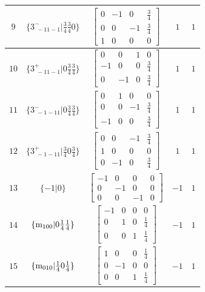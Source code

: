 \documentclass[fleqn,8pt]{jsarticle}
\begin{document}
\begin{longtable}{ccccc}
$ 9 $ & $ \{3^{-}_{\,\,-11-1}|\frac{3}{4} \frac{3}{4} 0\} $ & $ \begin{bmatrix} 0 & -1 & 0 & \frac{3}{4} \\ 0 & 0 & -1 & \frac{3}{4} \\ 1 & 0 & 0 & 0 \end{bmatrix} $ & $ 1 $ & $ 1 $ \\ \hline
$ 10 $ & $ \{3^{+}_{\,\,-11-1}|0 \frac{3}{4} \frac{3}{4}\} $ & $ \begin{bmatrix} 0 & 0 & 1 & 0 \\ -1 & 0 & 0 & \frac{3}{4} \\ 0 & -1 & 0 & \frac{3}{4} \end{bmatrix} $ & $ 1 $ & $ 1 $ \\ \hline
$ 11 $ & $ \{3^{-}_{\,\,-1-11}|0 \frac{3}{4} \frac{3}{4}\} $ & $ \begin{bmatrix} 0 & 1 & 0 & 0 \\ 0 & 0 & -1 & \frac{3}{4} \\ -1 & 0 & 0 & \frac{3}{4} \end{bmatrix} $ & $ 1 $ & $ 1 $ \\ \hline
$ 12 $ & $ \{3^{+}_{\,\,-1-11}|\frac{3}{4} 0 \frac{3}{4}\} $ & $ \begin{bmatrix} 0 & 0 & -1 & \frac{3}{4} \\ 1 & 0 & 0 & 0 \\ 0 & -1 & 0 & \frac{3}{4} \end{bmatrix} $ & $ 1 $ & $ 1 $ \\ \hline
$ 13 $ & $ \{-1|0\} $ & $ \begin{bmatrix} -1 & 0 & 0 & 0 \\ 0 & -1 & 0 & 0 \\ 0 & 0 & -1 & 0 \end{bmatrix} $ & $ -1 $ & $ 1 $ \\ \hline
$ 14 $ & $ \{{\rm m}_{100}|0 \frac{1}{4} \frac{1}{4}\} $ & $ \begin{bmatrix} -1 & 0 & 0 & 0 \\ 0 & 1 & 0 & \frac{1}{4} \\ 0 & 0 & 1 & \frac{1}{4} \end{bmatrix} $ & $ -1 $ & $ 1 $ \\ \hline
$ 15 $ & $ \{{\rm m}_{010}|\frac{1}{4} 0 \frac{1}{4}\} $ & $ \begin{bmatrix} 1 & 0 & 0 & \frac{1}{4} \\ 0 & -1 & 0 & 0 \\ 0 & 0 & 1 & \frac{1}{4} \end{bmatrix} $ & $ -1 $ & $ 1 $ \\ \hline

\end{longtable}
\end{document}
